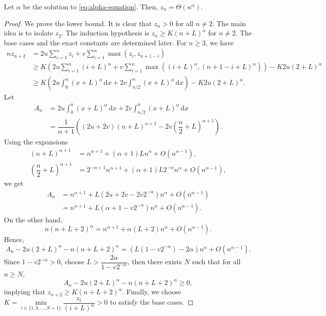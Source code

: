 \begin{theorem}
  \label{thm:theta-asymptotics}
  Let $\alpha$ be the solution to \eqref{eq:alpha-equation}. Then, $z_n = \Theta(n^{\alpha})$.
\end{theorem}
\begin{proof}
  We prove the lower bound. It is clear that $z_n > 0$ for all $n\ne 2$. The main idea is to isolate $z_2$. The induction hypothesis is $z_n \ge K (n+L)^\alpha$ for $n\neq 2$. The base cases and the exact constants are determined later. For $n \ge 3$, we have
  \begin{align*}
    nz_{n+2}
     & = 2u\sum\limits_{i=1}^n z_i + v\sum\limits_{i=1}^n \max(z_i, z_{n+1-i})                                                                \\
     & \ge K\left(2u\sum\limits_{i=1}^{n} (i+L)^\alpha + v\sum\limits_{i=1}^{n} \max((i+L)^\alpha, (n+1-i+L)^\alpha)\right) - K2u(2+L)^\alpha \\
     & \ge K\left(2u\int_0^{n} (x+L)^\alpha \, \mathrm{d}x + 2v\int_{n/2}^{n} (x+L)^\alpha \, \mathrm{d}x\right) - K2u(2+L)^\alpha.
  \end{align*}
  Let
  \begin{align*}
    A_n
     & = 2u\int_0^{n} (x+L)^\alpha \, \mathrm{d}x + 2v\int_{n/2}^{n} (x+L)^\alpha \, \mathrm{d}x             \\
     & = \dfrac{1}{\alpha+1}\left((2u+2v)(n+L)^{\alpha+1} - 2v\left(\dfrac{n}{2}+L\right)^{\alpha+1}\right).
  \end{align*}
  Using the expansions
  \begin{align*}
    (n+L)^{\alpha+1}                       & = n^{\alpha+1} + (\alpha+1)L n^\alpha + O(n^{\alpha-1}),                         \\
    \left(\dfrac{n}{2}+L\right)^{\alpha+1} & = 2^{-\alpha+1}n^{\alpha+1} + (\alpha+1)L2^{-\alpha} n^\alpha + O(n^{\alpha-1}),
  \end{align*}
  we get
  \begin{align*}
    A_n
     & = n^{\alpha+1} + L(2u+2v-2v2^{-\alpha})n^\alpha + O(n^{\alpha-1})        \\
     & = n^{\alpha+1} + L(\alpha + 1 - v2^{-\alpha})n^\alpha + O(n^{\alpha-1}).
  \end{align*}
  On the other hand,
  $$n(n+L+2)^\alpha = n^{\alpha+1} + \alpha(L+2) n^\alpha + O(n^{\alpha-1}).$$
  Hence,
  $$A_n - 2u(2+L)^\alpha - n(n+L+2)^\alpha = (L(1-v2^{-\alpha}) - 2\alpha) n^\alpha + O(n^{\alpha-1}).$$
  Since $1-v2^{-\alpha} > 0$, choose $L>\dfrac{2\alpha}{1-v2^{-\alpha}}$, then there exists $N$ such that for all $n \ge N$,
  $$A_n - 2u(2+L)^\alpha - n(n+L+2)^\alpha \ge 0,$$
  implying that $z_{n+2} \ge K(n+L+2)^\alpha$. Finally, we choose
  $K = \min\limits_{i\in\{1,3,\ldots, N+1\}}\dfrac{z_i}{(i+L)^\alpha} > 0$ to satisfy the base cases.


\end{proof}
